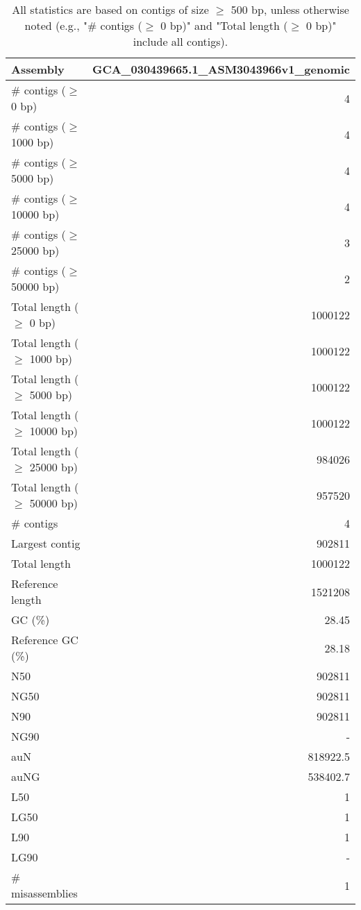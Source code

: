 \documentclass[12pt,a4paper]{article}
\begin{document}
\begin{table}[ht]
\begin{center}
\caption{All statistics are based on contigs of size $\geq$ 500 bp, unless otherwise noted (e.g., "\# contigs ($\geq$ 0 bp)" and "Total length ($\geq$ 0 bp)" include all contigs).}
\begin{tabular}{|l*{1}{|r}|}
\hline
Assembly & GCA\_030439665.1\_ASM3043966v1\_genomic \\ \hline
\# contigs ($\geq$ 0 bp) & 4 \\ \hline
\# contigs ($\geq$ 1000 bp) & 4 \\ \hline
\# contigs ($\geq$ 5000 bp) & 4 \\ \hline
\# contigs ($\geq$ 10000 bp) & 4 \\ \hline
\# contigs ($\geq$ 25000 bp) & 3 \\ \hline
\# contigs ($\geq$ 50000 bp) & 2 \\ \hline
Total length ($\geq$ 0 bp) & 1000122 \\ \hline
Total length ($\geq$ 1000 bp) & 1000122 \\ \hline
Total length ($\geq$ 5000 bp) & 1000122 \\ \hline
Total length ($\geq$ 10000 bp) & 1000122 \\ \hline
Total length ($\geq$ 25000 bp) & 984026 \\ \hline
Total length ($\geq$ 50000 bp) & 957520 \\ \hline
\# contigs & 4 \\ \hline
Largest contig & 902811 \\ \hline
Total length & 1000122 \\ \hline
Reference length & 1521208 \\ \hline
GC (\%) & 28.45 \\ \hline
Reference GC (\%) & 28.18 \\ \hline
N50 & 902811 \\ \hline
NG50 & 902811 \\ \hline
N90 & 902811 \\ \hline
NG90 & - \\ \hline
auN & 818922.5 \\ \hline
auNG & 538402.7 \\ \hline
L50 & 1 \\ \hline
LG50 & 1 \\ \hline
L90 & 1 \\ \hline
LG90 & - \\ \hline
\# misassemblies & 1 \\ \hline

\end{tabular}
\end{center}
\end{table}
\end{document}
